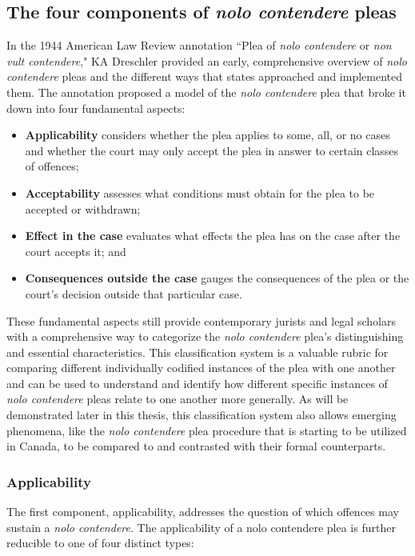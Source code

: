 \subsection{The four components of \textit{nolo contendere} pleas}

In the 1944 American Law Review annotation ``Plea of \textit{nolo contendere} or \textit{non vult contendere}," KA Dreschler provided an early, comprehensive overview of \textit{nolo contendere} pleas and the different ways that states approached and implemented them. The annotation proposed a model of the \textit{nolo contendere} plea that broke it down into four fundamental aspects:

\begin{itemize}
    \item \textbf{Applicability} considers whether the plea applies to some, all, or no cases and whether the court may only accept the plea in answer to certain classes of offences;
    \item \textbf{Acceptability} assesses what conditions must obtain for the plea to be accepted or withdrawn;
    \item \textbf{Effect in the case} evaluates what effects the plea has on the case after the court accepts it; and
    \item \textbf{Consequences outside the case} gauges the consequences of the plea or the court's decision outside that particular case.
\end{itemize}

These fundamental aspects still provide contemporary jurists and legal scholars with a comprehensive way to categorize the \textit{nolo contendere} plea's distinguishing and essential characteristics. This classification system is a valuable rubric for comparing different individually codified instances of the plea with one another and can be used to understand and identify how different specific instances of \textit{nolo contendere} pleas relate to one another more generally. As will be demonstrated later in this thesis, this classification system also allows emerging phenomena, like the \textit{nolo contendere} plea procedure that is starting to be utilized in Canada, to be compared to and contrasted with their formal counterparts.

\subsubsection{Applicability}

The first component, applicability, addresses the question of which offences may sustain a \textit{nolo contendere}. The applicability of a nolo contendere plea is further reducible to one of four distinct types:

